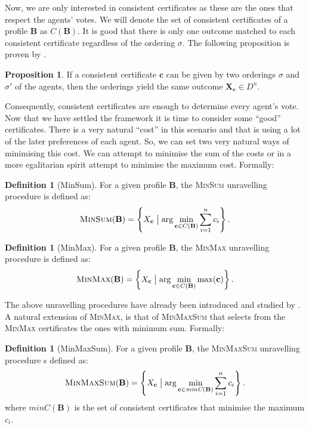 \documentclass[11pt,a4paper, titlepage]{article}
\theoremstyle{definition}
\newtheorem{definition}[theorem]{Definition}
\newtheorem{proposition}[theorem]{Proposition}
\let\vec\mathbf
\begin{document}
Now, we are only interested in consistent certificates as these are the ones that respect the agents' votes. We will denote the set of consistent certificates of a profile $\mathbf{B}$ as $C(\mathbf{B})$.
It is good that there is only one outcome matched to each consistent certificate regardless of the ordering $\sigma$. The following proposition is proven by \cite{grandi}.

\begin{proposition}
    If a consistent certificate $\mathbf{c}$ can be given by two orderings $\sigma$ and $\sigma'$ of the agents, then the orderings yield the same outcome $\vec{X}_\mathbf{c} \in D^n$.
\end{proposition}

Consequently, consistent certificates are enough to determine every agent's vote. 
Now that we have settled the framework it is time to consider some ``good'' certificates. 
There is a very natural ``cost'' in this scenario and that is using a lot of the later preferences of each agent. 
So, we can set two very natural ways of minimising this cost. 
We can attempt to minimise the sum of the costs or in a more egalitarian spirit attempt to minimise the maximum cost. 
Formally:

\begin{definition}[MinSum]
    For a given profile $\mathbf{B}$, the \textsc{MinSum} unravelling procedure is defined as:
    \[
        \textsc{MinSum}(\mathbf{B}) = 
        \left\{X_{\mathbf{c}} \bigm| \mathrm{arg} \min_{\mathbf{c} \in C(\mathbf{B})} \sum_{i=1}^n c_i\right\}.
    \]
\end{definition}

\begin{definition}[MinMax]
    For a given profile $\mathbf{B}$, the \textsc{MinMax} unravelling procedure is defined as:
    \[
        \textsc{MinMax}(\mathbf{B}) = \left\{X_{\mathbf{c}} \bigm| \mathrm{arg} \min_{\mathbf{c} \in C(\mathbf{B})} \max (\mathbf{c}) \right\}.
    \]
\end{definition}

The above unravelling procedures have already been introduced and studied by  \cite{grandi}. 
A natural extension of \textsc{MinMax}, is that of \textsc{MinMaxSum} that selects from the \textsc{MinMax} certificates the ones with minimum sum. 
Formally:

\begin{definition}[MinMaxSum]
    For a given profile $\mathbf{B}$, the \textsc{MinMaxSum} unravelling procedure s defined as:
    \[
        \textsc{MinMaxSum}(\mathbf{B}) =  \left\{ X_{\mathbf{c}} \bigm| \arg  \min_{\vec{c} \in \mathit{minC}(\mathbf{B})} \sum_{i=1}^n c_i \right\}.
    \]
    where $\mathit{minC}(\vec{B})$ is the set of consistent certificates that minimise the maximum $c_i$. 
\end{definition}
\end{document}
